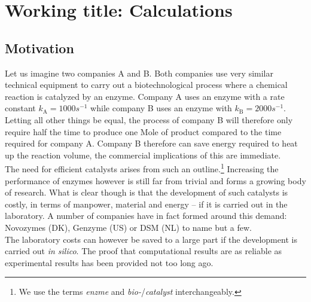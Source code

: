 \chapter[Working title: Calculations]
{Working title: Calculations\label{ch1}}


\section{Motivation}\label{sec:mot}
Let us imagine two companies A and B.
Both companies use very similar technical equipment to carry out a biotechnological process where a chemical reaction is catalyzed by an enzyme.
Company A uses an enzyme with a rate constant $k_\text{A} = 1000s^{-1}$ while company B uses an enzyme with $k_\text{B} = 2000s^{-1}$.
Letting all other things be equal, the process of company B will therefore only require half the time to produce one Mole of product compared to the time required for company A.
Company B therefore can save energy required to heat up the reaction volume, the commercial implications of this are immediate.\\
The need for efficient catalysts arises from such an outline.\footnote{We use the terms \textit{enzme} and \textit{bio-}/\textit{catalyst} interchangeably.}
Increasing the performance of enzymes however is still far from trivial and forms a growing body of research.
What is clear though is that the development of such catalysts is costly, in terms of manpower, material and energy -- if it is carried out in the laboratory.
A number of companies have in fact formed around this demand: Novozymes (DK), Genzyme (US) or DSM (NL) to name but a few\citep{meyer2013use}.\\
The laboratory costs can however be saved to a large part if the development is carried out \textit{in silico}.
The proof that computational results are as reliable as experimental results has been provided not too long ago\citep{claeyssens2006high}.


